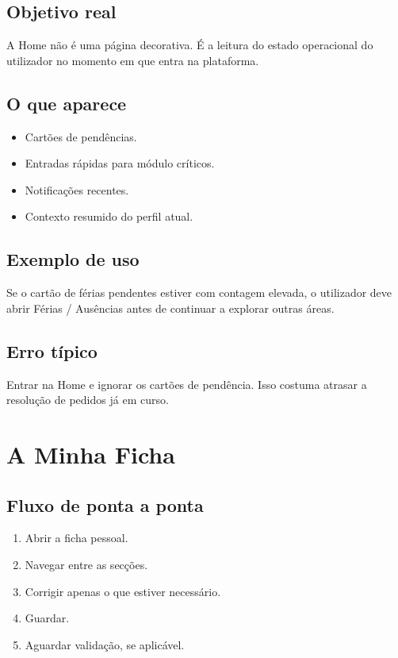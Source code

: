 \subsection{Objetivo real}
A Home não é uma página decorativa. É a leitura do estado operacional do utilizador no momento em que entra na plataforma.

\subsection{O que aparece}
\begin{itemize}
  \item Cartões de pendências.
  \item Entradas rápidas para módulo críticos.
  \item Notificações recentes.
  \item Contexto resumido do perfil atual.
\end{itemize}

\subsection{Exemplo de uso}
Se o cartão de férias pendentes estiver com contagem elevada, o utilizador deve abrir Férias / Ausências antes de continuar a explorar outras áreas.

\subsection{Erro típico}
Entrar na Home e ignorar os cartões de pendência. Isso costuma atrasar a resolução de pedidos já em curso.

\section{A Minha Ficha}
\subsection{Fluxo de ponta a ponta}
\begin{enumerate}
  \item Abrir a ficha pessoal.
  \item Navegar entre as secções.
  \item Corrigir apenas o que estiver necessário.
  \item Guardar.
  \item Aguardar validação, se aplicável.
\end{enumerate}

